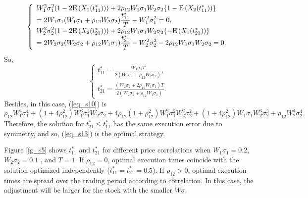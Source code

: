 \[
\left\{
  \begin{array}{ll}
    \displaystyle W_1^2\sigma_1^2(1-2{\mathrm{E}}\left( X_1(t_{11}^*) \right))+2\rho_{12}W_1\sigma_1W_2\sigma_2\{1-{\mathrm{E}}\left( X_2(t_{11}^*) \right)\} \\
    \displaystyle =2W_1\sigma_1(W_1\sigma_1+\rho_{12}W_2\sigma_2)\frac{t_{11}^*}{T}-W_1^2\sigma_1^2 =0,\\
    \displaystyle W_2^2\sigma_2^2(1-2{\mathrm{E}}\left( X_2(t_{21}^*) \right))+2\rho_{12}W_1\sigma_1W_2\sigma_2\{-{\mathrm{E}}\left( X_1(t_{21}^*) \right)\} \\
    =\displaystyle 2W_2\sigma_2(W_2\sigma_2+\rho_{12}W_1\sigma_1)\frac{t_{21}^*}{T}-W_2^2\sigma_2^2 -2\rho_{12}W_1\sigma_1W_2\sigma_2=0.
  \end{array}
\right.
\]
So,
\begin{equation}\label{eq_s13}
\left\{
  \begin{array}{ll}
    \displaystyle t_{11}^*=\frac{W_1\sigma_1T}{2(W_1\sigma_1+\rho_{12}W_2\sigma_2)}, \\
    \displaystyle t_{21}^*=\frac{(W_2\sigma_2+2\rho_{12}W_1\sigma_1)T}{2(W_2\sigma_2+\rho_{12}W_1\sigma_1)}.
  \end{array}
\right.
\end{equation}
Besides, in this case, (\ref{eq_s10}) is 
\[
  \rho_{12}W_1^4\sigma_1^4+(1+4\rho_{12}^2)W_1^3\sigma_1^3W_2\sigma_2+4\rho_{12}(1+\rho_{12}^2)W_1^2\sigma_1^2W_2^2\sigma_2^2+(1+4\rho_{12}^2)W_1\sigma_1W_2^3\sigma_2^3+\rho_{12}W_2^4\sigma_2^4.
\]
Therefore, the solution for $t_{21}^* \leq t_{11}^*$ has the same execution error due to symmetry, and so, (\ref{eq_s13}) is the optimal strategy.

Figure \ref{fg_s5} shows $t_{11}^*$ and $t_{21}^*$ for different price correlations when $W_1\sigma_1=0.2$, $W_2\sigma_2=0.1$ , and $T=1$.  If $\rho_{12}=0$, optimal execution times coincide with the solution optimized independently ($t_{11}^*=t_{21}^*=0.5$).  If $\rho_{12}>0$, optimal execution times are spread over the trading period according to correlation.  In this case, the adjustment will be larger for the stock with the smaller $W\sigma$.

